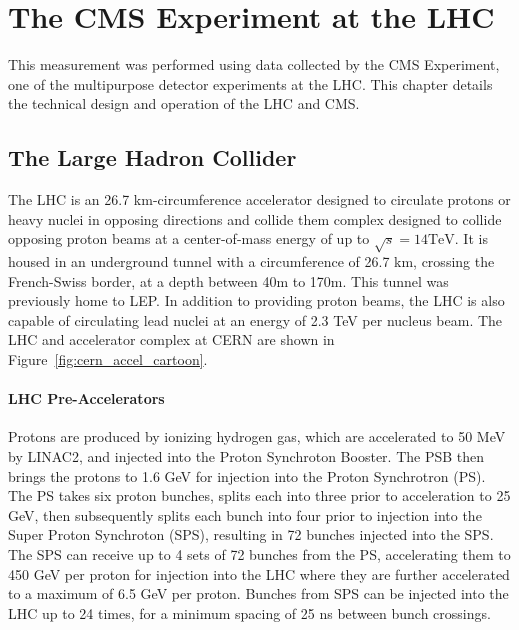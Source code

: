 \chapter{The CMS Experiment at the LHC}\label{ch:exp}
This measurement was performed using data collected by the CMS Experiment, one of the multipurpose detector experiments at the LHC. This chapter details the technical design and operation of the LHC and CMS. 


\section{The Large Hadron Collider}
The LHC is an 26.7 km-circumference accelerator designed to circulate protons or heavy nuclei in opposing directions and collide them  complex designed to collide opposing proton beams at a center-of-mass energy of up to $\sqrt{s}=14\mathrm{TeV}$. It is housed in an underground tunnel with a circumference of 26.7 km, crossing the French-Swiss border, at a depth between 40m to 170m. This tunnel was previously home to LEP. In addition to providing proton beams, the LHC is also capable of circulating lead nuclei at an energy of 2.3 TeV per nucleus beam. The LHC and accelerator complex at CERN are shown in Figure~\ref{fig:cern_accel_cartoon}.


\subsubsection{LHC Pre-Accelerators}
Protons are produced by ionizing hydrogen gas, which are accelerated to 50 MeV by LINAC2, and injected into the Proton Synchroton Booster. The PSB then brings the protons to 1.6 GeV for injection into the Proton Synchrotron (PS). The PS takes six proton bunches, splits each into three prior to acceleration to 25 GeV, then subsequently splits each bunch into four prior to injection into the Super Proton Synchroton (SPS), resulting in 72 bunches injected into the SPS. The SPS can receive up to 4 sets of 72 bunches from the PS, accelerating them to 450 GeV per proton for injection into the LHC where they are further accelerated to a maximum of 6.5 GeV per proton. Bunches from SPS can be injected into the LHC up to 24 times, for a minimum spacing of 25 ns between bunch crossings\cite{Benedikt:2004wm}. 

